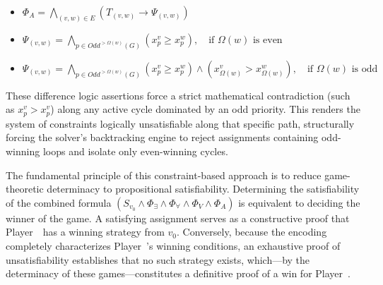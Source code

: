 \documentclass[a4paper,fleqn]{cas-sc}
\begin{document}
\begin{itemize}
    \item $\Phi_A = \bigwedge_{(v,w) \in E} \left(T_{(v,w)} \rightarrow \Psi_{(v,w)}\right)$
    \item $\Psi_{(v,w)} = \bigwedge_{p \in \textit{Odd}^{>\Omega(w)}(G)} (x_p^v \geqslant x_p^w), \quad \text{if } \Omega(w) \text{ is even}$
    \item $\Psi_{(v,w)} = \bigwedge_{p \in \textit{Odd}^{>\Omega(w)}(G)} (x_p^v \geqslant x_p^w) \land (x_{\Omega(w)}^v > x_{\Omega(w)}^w), \quad \text{if } \Omega(w) \text{ is odd}$
\end{itemize}
These difference logic assertions force a strict mathematical contradiction (such as $x_p^v > x_p^v$) along any active cycle dominated by an odd priority. This renders the system of constraints logically unsatisfiable along that specific path, structurally forcing the solver's backtracking engine to reject assignments containing odd-winning loops and isolate only even-winning cycles.

The fundamental principle of this constraint-based approach is to reduce game-theoretic determinacy to propositional satisfiability. Determining the satisfiability of the combined formula $(S_{v_0} \wedge \Phi_{\exists} \wedge \Phi_{\forall} \wedge \Phi_V \wedge \Phi_A)$ is equivalent to deciding the winner of the game. A satisfying assignment serves as a constructive proof that Player~\even\ has a winning strategy from $v_0$. Conversely, because the encoding completely characterizes Player~\even's winning conditions, an exhaustive proof of unsatisfiability establishes that no such strategy exists, which—by the determinacy of these games—constitutes a definitive proof of a win for Player~\odd.
\end{document}
